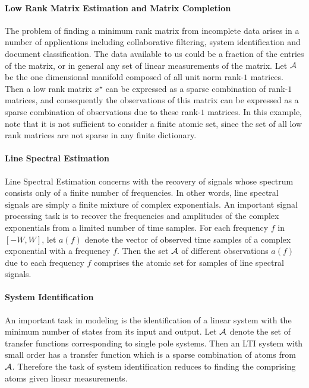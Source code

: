 \paragraph{Low Rank Matrix Estimation and Matrix Completion}

The problem of finding a minimum rank matrix from incomplete data arises in a
number of applications including collaborative filtering, system identification
and document classification. The data available to us could be a fraction of the
entries of the matrix, or in general any set of linear measurements of the
matrix. Let $\mathcal{A}$ be the one dimensional manifold composed of all unit norm
rank-$1$ matrices. Then a low rank matrix $x^\star$ can be expressed as a sparse
combination of rank-$1$ matrices, and consequently the observations of this
matrix can be expressed as a sparse combination of observations due to these
rank-$1$ matrices. In this example, note that it is not sufficient to consider a
finite atomic set, since the set of all low rank matrices are not sparse in any
finite dictionary.

\paragraph{Line Spectral Estimation} Line Spectral Estimation concerns with the
recovery of signals whose spectrum consists only of a finite number of
frequencies. In other words, line spectral signals are simply a finite mixture
of complex exponentials. An important signal processing task is to recover the
frequencies and amplitudes of the complex exponentials from a limited number of
time samples. For each frequency $f$ in $[-W,W]$, let $a(f)$ denote the vector
of observed time samples of a complex exponential with a frequency $f$. Then the
set $\mathcal{A}$ of different observations $a(f)$ due to each frequency $f$
comprises the atomic set for samples of line spectral signals.

\paragraph{System Identification} An important task in modeling is the
identification of a linear system with the minimum number of states from its
input and output. Let $\mathcal{A}$ denote the set of transfer functions corresponding to
single pole systems. Then an LTI system with small order has a transfer function
which is a sparse combination of atoms from $\mathcal{A}$. Therefore the task of system
identification reduces to finding the comprising atoms given linear
measurements.

